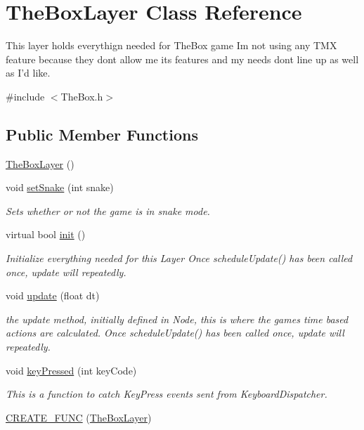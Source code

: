 \hypertarget{class_the_box_layer}{\section{\-The\-Box\-Layer \-Class \-Reference}
\label{class_the_box_layer}
}


\-This layer holds everythign needed for \-The\-Box game \-Im not using any \-T\-M\-X feature because they dont allow me its features and my needs dont line up as well as \-I'd like.  




{\ttfamily \#include $<$\-The\-Box.\-h$>$}

\subsection*{\-Public \-Member \-Functions}
\begin{DoxyCompactItemize}
\item 
\hyperlink{class_the_box_layer_aa03bfd041ff7d3b64d305c76dcec2a7a}{\-The\-Box\-Layer} ()
\item 
void \hyperlink{class_the_box_layer_a2a76eca9790faad7097e37d5822d5e3e}{set\-Snake} (int snake)
\begin{DoxyCompactList}\small\item\em \-Sets whether or not the game is in snake mode. \end{DoxyCompactList}\item 
virtual bool \hyperlink{class_the_box_layer_ac15f63f9808501a2aa7d725259068fd1}{init} ()
\begin{DoxyCompactList}\small\item\em \-Initialize everything needed for this \-Layer \-Once schedule\-Update() has been called once, update will repeatedly. \end{DoxyCompactList}\item 
void \hyperlink{class_the_box_layer_a26cd4adbaec048f0df01ddb085c2beb7}{update} (float dt)
\begin{DoxyCompactList}\small\item\em the update method, initially defined in \-Node, this is where the games time based actions are calculated. \-Once schedule\-Update() has been called once, update will repeatedly. \end{DoxyCompactList}\item 
void \hyperlink{class_the_box_layer_af367b00c0d970f0c5e25a74ad28eb5cf}{key\-Pressed} (int key\-Code)
\begin{DoxyCompactList}\small\item\em \-This is a function to catch \-Key\-Press events sent from \-Keyboard\-Dispatcher. \end{DoxyCompactList}\item 
\hyperlink{class_the_box_layer_a2b2a79bf9a1dbb25a702a6a21623c658}{\-C\-R\-E\-A\-T\-E\-\_\-\-F\-U\-N\-C} (\hyperlink{class_the_box_layer}{\-The\-Box\-Layer})
\end{DoxyCompactItemize}
